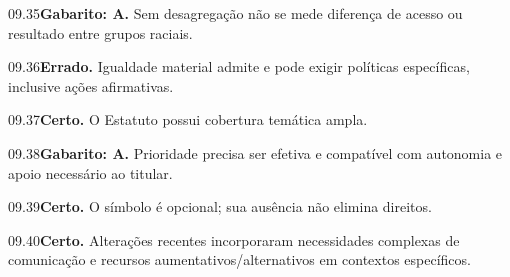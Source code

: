 \begin{solucao}{09.35}\textbf{Gabarito: A.} Sem desagregação não se mede diferença de acesso ou resultado entre grupos raciais.\end{solucao}
\begin{solucao}{09.36}\textbf{Errado.} Igualdade material admite e pode exigir políticas específicas, inclusive ações afirmativas.\end{solucao}
\begin{solucao}{09.37}\textbf{Certo.} O Estatuto possui cobertura temática ampla.\end{solucao}
\begin{solucao}{09.38}\textbf{Gabarito: A.} Prioridade precisa ser efetiva e compatível com autonomia e apoio necessário ao titular.\end{solucao}
\begin{solucao}{09.39}\textbf{Certo.} O símbolo é opcional; sua ausência não elimina direitos.\end{solucao}
\begin{solucao}{09.40}\textbf{Certo.} Alterações recentes incorporaram necessidades complexas de comunicação e recursos aumentativos/alternativos em contextos específicos.\end{solucao}


